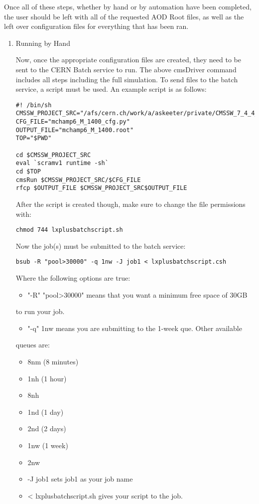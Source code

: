 \documentclass[11pt]{article}
\begin{document}
\begin{enumerate}
Once all of these steps, whether by hand or by automation have
been completed, the user should be left with all of the
requested AOD Root files, as well as the left over configuration
files for everything that has been ran.
\begin{enumerate}
\item Running by Hand
\label{sec-1-1-2-2-1}

Now, once the appropriate configuration files are created, they
need to be sent to the CERN Batch service to run. The above
cmsDriver command includes all steps including the full
simulation. To send files to the batch service, a script must be
used. An example script is as follows:

\begin{verbatim}
#! /bin/sh
CMSSW_PROJECT_SRC="/afs/cern.ch/work/a/askeeter/private/CMSSW_7_4_4_patch4/src/"
CFG_FILE="mchamp6_M_1400_cfg.py"
OUTPUT_FILE="mchamp6_M_1400.root"
TOP="$PWD"

cd $CMSSW_PROJECT_SRC
eval `scramv1 runtime -sh`
cd $TOP
cmsRun $CMSSW_PROJECT_SRC/$CFG_FILE
rfcp $OUTPUT_FILE $CMSSW_PROJECT_SRC$OUTPUT_FILE
\end{verbatim}

After the script is created though, make sure to change the file
permissions with:
\begin{verbatim}
chmod 744 lxplusbatchscript.sh
\end{verbatim}

Now the job(s) must be submitted to the batch service:
\begin{verbatim}
bsub -R "pool>30000" -q 1nw -J job1 < lxplusbatchscript.csh
\end{verbatim}
Where the following options are true: 
\begin{itemize}
\item "-R" "pool>30000" means that you want a minimum free space of 30GB
\end{itemize}
to run your job. 
\begin{itemize}
\item "-q" 1nw means you are submitting to the 1-week que. Other available
\end{itemize}
queues are:
\begin{itemize}
\item 8nm (8 minutes)
\item 1nh (1 hour)
\item 8nh
\item 1nd (1 day)
\item 2nd (2 days)
\item 1nw (1 week)
\item 2nw
\item -J job1 sets job1 as your job name
\item < lxplusbatchscript.sh gives your script to the job.
\end{itemize}


\end{enumerate}
\end{enumerate}
\end{document}

